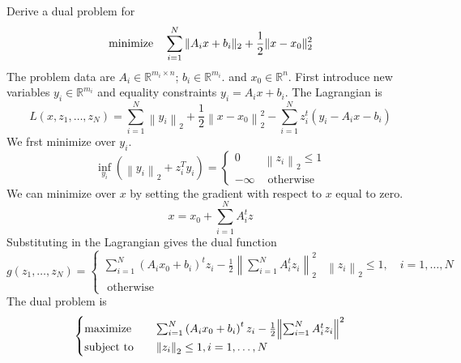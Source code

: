 \begin{problem}[5.11]
    Derive a dual problem for \[\operatorname{minimize} \quad \sum_{i = 1}^N \|A_ix + b_i\|_2 + \frac{1}{2}\|x - x_0\|_2^2\] The problem data are $A_i \in \mathbb{R}^{m_i \times n}$; $b_i \in \mathbb{R}^{m_i}$. and $x_0 \in \mathbb{R}^n$. First introduce new variables $y_i \in \mathbb{R}^{m_i}$ and equality constraints $y_i = A_ix + b_i$.
    \Answer The Lagrangian is\[L\left(x, z_{1}, \ldots, z_{N}\right)=\sum_{i=1}^{N}\left\|y_{i}\right\|_{2}+\frac{1}{2}\left\|x-x_{0}\right\|_{2}^{2}-\sum_{i=1}^{N} z_{i}^{t}\left(y_{i}-A_{i} x-b_{i}\right)\]We frst minimize over $y_i$.\[\inf _{y_{i}}\left(\left\|y_{i}\right\|_{2}+z_{i}^{T} y_{i}\right)=\left\{\begin{array}{ll}
        0 & \left\|z_{i}\right\|_{2} \leq 1 \\
        -\infty & \text { otherwise }
    \end{array}\right.\]
    We can minimize over $x$ by setting the gradient with respect to $x$ equal to zero. \[x = x_0 + \sum_{i = 1}^NA_i^tz\]
    Substituting in the Lagrangian gives the dual function \[g\left(z_{1}, \ldots, z_{N}\right)=\left\{\begin{array}{ll}
        \sum_{i=1}^{N}\left(A_{i} x_{0}+b_{i}\right)^{t} z_{i}-\frac{1}{2}\left\|\sum_{i=1}^{N} A_{i}^{t} z_{i}\right\|_{2}^{2} & \left\|z_{i}\right\|_{2} \leq 1, \quad i=1, \ldots, N \\
        \text { otherwise }
        \end{array}\right.\]
    The dual problem is\[\begin{cases}
        \operatorname{maximize}\quad &\sum_{i=1}^{N}\left(A_{i} x_{0}+b_{i}\right)^{t} z_{i} - \frac{1}{2}\norm{\sum_{i=1}^{N} A_{i}^{t} z_{i}}^2\\
        \operatorname{subject\ to} \quad &\norm{z_i}_2 \le 1, i = 1, \dots, N
    \end{cases}\]
\end{problem}

